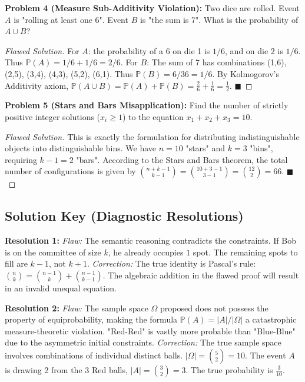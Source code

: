 \documentclass[11pt]{article}
\theoremstyle{definition}
\theoremstyle{plain}
\theoremstyle{remark}
\newcommand{\Prob}{\mathbb{P}}
\newcommand{\sample}{\Omega}
\begin{document}
\textbf{Problem 4 (Measure Sub-Additivity Violation):} Two dice are rolled. Event $A$ is "rolling at least one 6". Event $B$ is "the sum is 7". What is the probability of $A \cup B$?
\begin{proof}[Flawed Solution]
For $A$: the probability of a 6 on die 1 is $1/6$, and on die 2 is $1/6$. Thus $\Prob(A) = 1/6 + 1/6 = 2/6$. 
For $B$: The sum of 7 has combinations (1,6), (2,5), (3,4), (4,3), (5,2), (6,1). Thus $\Prob(B) = 6/36 = 1/6$.
By Kolmogorov's Additivity axiom, $\Prob(A \cup B) = \Prob(A) + \Prob(B) = \frac{2}{6} + \frac{1}{6} = \frac{1}{2}$. $\blacksquare$
\end{proof}

\textbf{Problem 5 (Stars and Bars Misapplication):} Find the number of strictly positive integer solutions ($x_i \ge 1$) to the equation $x_1 + x_2 + x_3 = 10$. 
\begin{proof}[Flawed Solution]
This is exactly the formulation for distributing indistinguishable objects into distinguishable bins. We have $n=10$ "stars" and $k=3$ "bins", requiring $k-1 = 2$ "bars". According to the Stars and Bars theorem, the total number of configurations is given by $\binom{n+k-1}{k-1} = \binom{10+3-1}{3-1} = \binom{12}{2} = 66$. $\blacksquare$
\end{proof}

\vspace{1cm}
\subsection{Solution Key (Diagnostic Resolutions)}

\textbf{Resolution 1:} 
\textit{Flaw:} The semantic reasoning contradicts the constraints. If Bob is on the committee of size $k$, he already occupies $1$ spot. The remaining spots to fill are $k-1$, not $k+1$. 
\textit{Correction:} The true identity is Pascal's rule: $\binom{n}{k} = \binom{n-1}{k} + \binom{n-1}{k-1}$. The algebraic addition in the flawed proof will result in an invalid unequal equation.

\textbf{Resolution 2:}
\textit{Flaw:} The sample space $\sample$ proposed does not possess the property of equiprobability, making the formula $\Prob(A) = |A|/|\sample|$ a catastrophic measure-theoretic violation. "Red-Red" is vastly more probable than "Blue-Blue" due to the asymmetric initial constraints.
\textit{Correction:} The true sample space involves combinations of individual distinct balls. $|\sample| = \binom{5}{2} = 10$. The event $A$ is drawing 2 from the 3 Red balls, $|A| = \binom{3}{2} = 3$. The true probability is $\frac{3}{10}$.
\end{document}
